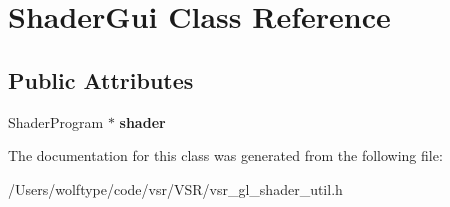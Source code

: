 \hypertarget{class_shader_gui}{\section{Shader\-Gui Class Reference}
\label{class_shader_gui}
}
\subsection*{Public Attributes}
\begin{DoxyCompactItemize}
\item 
\hypertarget{class_shader_gui_aefcb5c629c27c5a3c2b299af8ae14476}{Shader\-Program $\ast$ {\bfseries shader}}\label{class_shader_gui_aefcb5c629c27c5a3c2b299af8ae14476}

\end{DoxyCompactItemize}


The documentation for this class was generated from the following file\-:\begin{DoxyCompactItemize}
\item 
/\-Users/wolftype/code/vsr/\-V\-S\-R/vsr\-\_\-gl\-\_\-shader\-\_\-util.\-h\end{DoxyCompactItemize}
